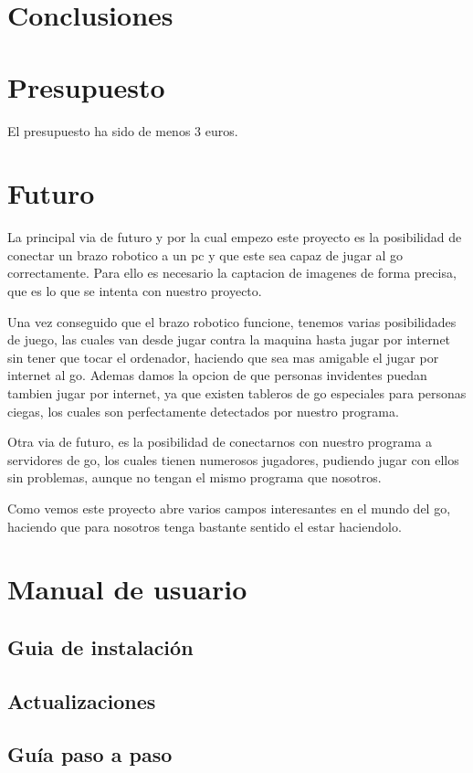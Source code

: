 \documentclass[12pt,a4paper]{report}
\begin{document}
\chapter{Conclusiones}


\chapter{Presupuesto}
El presupuesto ha sido de menos 3 euros.

\chapter{Futuro}


La principal via de futuro y por la cual empezo este proyecto es la posibilidad de conectar un brazo robotico a un pc y que este sea capaz de jugar al go correctamente. Para ello es necesario la captacion de imagenes de forma precisa, que es lo que se intenta con nuestro proyecto. 

Una vez conseguido que el brazo robotico funcione, tenemos varias posibilidades de juego, las cuales van desde jugar contra la maquina hasta jugar por internet sin tener que tocar el ordenador, haciendo que sea mas amigable el jugar por internet al go. Ademas damos la opcion de que personas invidentes puedan tambien jugar por internet, ya que existen tableros de go especiales para personas ciegas, los cuales son perfectamente detectados por nuestro programa.

Otra via de futuro, es la posibilidad de conectarnos con nuestro programa a servidores de go, los cuales tienen numerosos jugadores, pudiendo jugar con ellos sin problemas, aunque no tengan el mismo programa que nosotros.

Como vemos este proyecto abre varios campos interesantes en el mundo del go, haciendo que para nosotros tenga bastante sentido el estar haciendolo. 

\chapter{Manual de usuario}
\section{Guia de instalación}
\section{Actualizaciones}
\section{Guía paso a paso}
\end{document}
